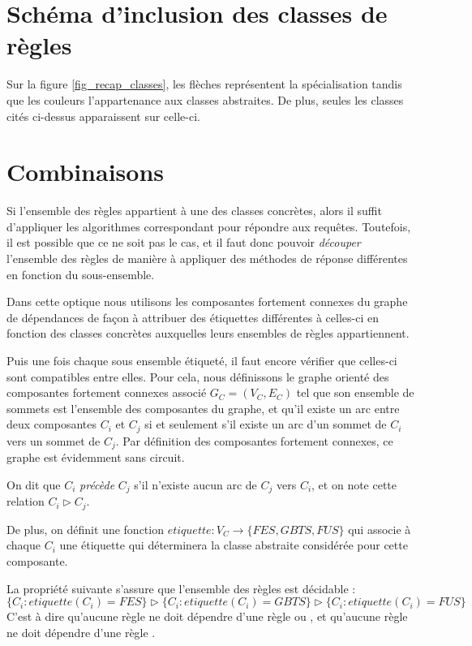 

\section{Schéma d'inclusion des classes de règles}
Sur la figure \ref{fig_recap_classes}, les flèches représentent la spécialisation tandis
que les couleurs l'appartenance aux classes abstraites. De plus, seules les classes cités
ci-dessus apparaissent sur celle-ci.


\section{Combinaisons}\label{combine}
Si l'ensemble des règles appartient à une des classes concrètes, alors il suffit
d'appliquer les algorithmes correspondant pour répondre aux requêtes. Toutefois, il est
possible que ce ne soit pas le cas, et il faut donc pouvoir {\em découper} l'ensemble des
règles de manière à appliquer des méthodes de réponse différentes en fonction du
sous-ensemble.

Dans cette optique nous utilisons les composantes fortement connexes du graphe de
dépendances
de façon à attribuer des étiquettes différentes à celles-ci en fonction
des classes concrètes auxquelles leurs ensembles de règles appartiennent.

Puis une fois chaque sous ensemble étiqueté, il faut encore vérifier que celles-ci
sont compatibles entre elles.
Pour cela, nous définissons le graphe orienté des composantes fortement connexes associé
$G_{C} = (V_C,E_C)$
tel que son ensemble de sommets est l'ensemble des composantes du graphe, et
qu'il existe un arc entre deux composantes $C_i$ et $C_j$ si et seulement s'il existe un
arc d'un sommet de $C_i$ vers un sommet de $C_j$.
Par définition des composantes fortement connexes, ce graphe est évidemment sans
circuit.

On dit que $C_i$ {\em précède} $C_j$ s'il n'existe aucun arc de $C_j$ vers $C_i$, et on
note cette relation $C_i \triangleright C_j$.

De plus, on définit une fonction $etiquette : V_C \rightarrow \{FES,GBTS,FUS\}$ qui
associe à chaque $C_i$ une étiquette qui déterminera la classe abstraite considérée pour
cette composante.

La propriété suivante s'assure que l'ensemble des règles est décidable :
$\{C_i : etiquette(C_i) = FES\} \triangleright \{C_i : etiquette(C_i) = GBTS\} \triangleright
\{C_i : etiquette(C_i) = FUS\}$
C'est à dire qu'aucune règle \fes ne doit dépendre d'une règle \fus ou \gbts, et
qu'aucune règle \gbts ne doit dépendre d'une règle \fus.

